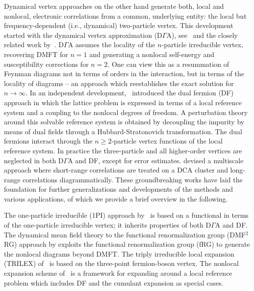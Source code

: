 \documentclass[rmp,aps,reprint,amsmath,amssymb,superscriptaddress,showpacs,nofootinbib]{revtex4-1}
\begin{document}
Dynamical vertex approaches on the other hand generate both, local and nonlocal, electronic correlations from a common, underlying entity: the local but frequency-dependent (i.e., dynamical) two-particle vertex. This development started with the  dynamical vertex approximation (D$\Gamma $A), see~ and the closely related work by~. D$\Gamma $A assumes  the locality of the $n$-particle irreducible vertex, recovering DMFT for $n=1$ and generating a nonlocal self-energy and susceptibility corrections for $n=2$. One can view this as a resummation of Feynman diagrams not in terms of orders in the interaction, but in terms of the locality of diagrams -- an approach which reestablishes the exact solution for $n\rightarrow \infty$. In an independent development,~ introduced the dual fermion (DF) approach in which the lattice problem is  expressed in terms of a local reference system and a coupling to the nonlocal degrees of freedom. A perturbation theory around this solvable reference system is obtained by decoupling the impurity by means of dual fields through a Hubbard-Stratonovich transformation. The dual fermions interact through the $n\geq 2$-particle vertex functions of the local reference system. In practice the three-particle and all higher-order vertices are neglected in both D$\Gamma$A and DF, except for error estimates.  devised a multiscale approach where short-range correlations are treated on a DCA cluster and long-range correlations diagrammatically. These groundbreaking works have laid the foundation for further generalizations and developments of the methods and various applications, of which we provide a brief overview in the following.

The one-particle irreducible (1PI) approach by~ is based on a functional in terms of the one-particle irreducible vertex; it inherits properties of both D$\Gamma$A and DF. The dynamical mean field theory to the functional renormalization group (DMF$^2$RG) approach by  exploits the functional renormalization group (fRG) to generate the nonlocal diagrams beyond DMFT.  The  triply irreducible local expansion (TRILEX) of~ is based on the three-point fermion-boson vertex. The nonlocal expansion scheme of~ is a framework for expanding around a local reference problem which includes DF and the cumulant expansion as  special cases.
\end{document}
